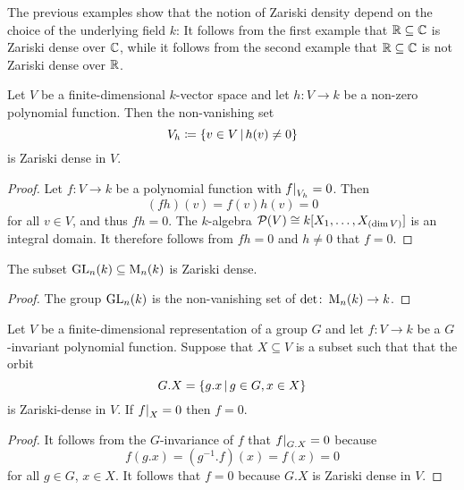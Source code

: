 \begin{warning}
  The previous examples show that the notion of Zariski density depend on the choice of the underlying field $k$:
  It follows from the first example that $\mathbb{R} \subseteq \mathbb{C}$ is Zariski dense over $\mathbb{C}$, while it follows from the second example that $\mathbb{R} \subseteq \mathbb{C}$ is not Zariski dense over $\mathbb{R}$.
\end{warning}


\begin{lemma}
  \label{lemma: non-vanishing set is dense}
  Let $V$ be a finite-dimensional $k$-vector space and let $h \colon V \to k$ be a non-zero polynomial function.
  Then the non-vanishing set
  \[
              V_h
    \defined  \{
                v \in V
              \suchthat
                h(v) \neq 0
              \}
  \]
  is Zariski dense in $V$.
\end{lemma}
\begin{proof}
  Let $f \colon V \to k$ be a polynomial function with $\restrict{f}{V_h} = 0$.
  Then
  \[
      (fh)(v)
    = f(v)h(v)
    = 0
  \]
  for all $v \in V$, and thus $fh = 0$.
  The $k$-algebra $\mathcal{P}(V) \cong k[X_1, \dotsc, X_{(\dim V)}]$ is an integral domain.
  It therefore follows from $fh = 0$ and $h \neq 0$ that $f = 0$.
\end{proof}


\begin{corollary}
  \label{corollary: GLn is Zariski dense in Mn}
  The subset $\operatorname{GL}_n(k) \subseteq \operatorname{M}_n(k)$ is Zariski dense.
\end{corollary}


\begin{proof}
  The group $\operatorname{GL}_n(k)$ is the non-vanishing set of $\det \colon \operatorname{M}_n(k) \to k$.
\end{proof}


\begin{lemma}
  \label{lemma: zariski density orbits}
  Let $V$ be a finite-dimensional representation of a group $G$ and let $f \colon V \to k$ be a $G$-invariant polynomial function.
  Suppose that $X \subseteq V$ is a subset such that that the orbit
  \[
      G.X
    = \{
        g.x
      \suchthat
        g \in G,
        x \in X
      \}
  \]
  is Zariski-dense in $V$.
  If $\restrict{f}{X} = 0$ then $f = 0$.
\end{lemma}


\begin{proof}
  It follows from the $G$-invariance of $f$ that $\restrict{f}{G.X} = 0$ because
  \[
      f(g.x)
    = \left( g^{-1}.f \right)(x)
    = f(x)
    = 0
  \]
  for all $g \in G$, $x \in X$.
  It follows that $f = 0$ because $G.X$ is Zariski dense in $V$.
\end{proof}


